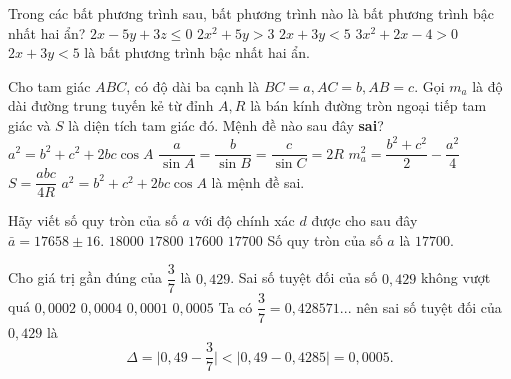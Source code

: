 \begin{ex}%
    Trong các bất phương trình sau, bất phương trình nào là bất phương trình bậc nhất hai ẩn?
    \choice
   {$2 x-5 y+3 z \leq 0$}
   {$2 x^2+5 y>3$}
   {\True $2 x+3 y<5$}
   {$3 x^2+2 x-4>0$}
    \loigiai
    {
        $2 x+3 y<5$ là bất phương trình bậc nhất hai ẩn.
    }
\end{ex}
 
 \begin{ex}%
     Cho tam giác $A B C$, có độ dài ba cạnh là $B C=a, A C=b, A B=c$. Gọi $m_a$ là độ dài đường trung tuyến kẻ từ đỉnh $A, R$ là bán kính đường tròn ngoại tiếp tam giác và $S$ là diện tích tam giác đó. Mệnh đề nào sau đây \textbf{sai}?
     \choice
      {$a^2=b^2+c^2+2 b c \cos A$}
     {$\dfrac{a}{\sin A}=\dfrac{b}{\sin B}=\dfrac{c}{\sin C}=2 R$}
     {$m_a^2=\dfrac{b^2+c^2}{2}-\dfrac{a^2}{4}$}
     {$S=\dfrac{a b c}{4 R}$}
     \loigiai
     {
         $a^2=b^2+c^2+2 b c \cos A$ là mệnh đề sai.    
     }
 \end{ex}

\begin{ex}%
    Hãy viết số quy tròn của số $a$ với độ chính xác $d$ được cho sau đây $\bar{a}=17658 \pm 16$.
    \choice
     {$18000$}
    {$17800$}
    {$17600$}
    {\True $17700$}
    \loigiai
    {
       Số quy tròn của số $a$ là $17700$.
    }
\end{ex}
\begin{ex}%
    Cho giá trị gần đúng của $\dfrac{3}{7}$ là $0{,}429$. Sai số tuyệt đối của số $0{,}429$ không vượt quá
    \choice
    {$0{,}0002$}
   {$0{,}0004$}
   {$0{,}0001$}
   {$0{,}0005$}
   \loigiai
    {
        Ta có $\dfrac{3}{7}=0{,}428571...$ nên sai số tuyệt đối của $0{,}429$ là
        $$\Delta=\big|0{,}49 -\dfrac{3}{7}\big|<\big|0{,}49 -0{,}4285\big|=0{,}0005.$$
    }
\end{ex}

